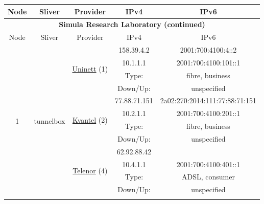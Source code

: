 \begin{small}
\begin{center}
\begin{longtable}{|c|c|c|c|c|c|c|c|}
 \multicolumn{2}{|p{8em}|}{Node} & \multicolumn{2}{|p{8em}|}{Sliver} & \multicolumn{2}{|p{8em}|}{Provider} & IPv4 & IPv6 \\ \hline
\endfirsthead
\hline
 \multicolumn{8}{|c|}{\textbf{Simula Research Laboratory (continued)}} \\ \hline
 \multicolumn{2}{|p{8em}|}{Node} & \multicolumn{2}{|p{8em}|}{Sliver} & \multicolumn{2}{|p{8em}|}{Provider} & IPv4 & IPv6 \\ \hline
\endhead
 \multirow{16}{*}{\tiny{1}} & \multicolumn{3}{|c|}{\multirow{16}{*}{\tiny{tunnelbox}}} & \multicolumn{2}{|c|}{\multirow{4}{*}{\tiny{\href{https://www.uninett.no}{Uninett} (1)}}} & \tiny{158.39.4.2} & \tiny{2001:700:4100:4::2} \\* \cline{7-7}\cline{8-8}
  & \multicolumn{3}{|c|}{} & \multicolumn{2}{|c|}{} & \tiny{10.1.1.1} & \tiny{2001:700:4100:101::1} \\* \cline{7-7}\cline{8-8}
  & \multicolumn{3}{|c|}{} & \multicolumn{2}{|c|}{} & Type: & fibre, business \\* \cline{7-7}\cline{8-8}
  & \multicolumn{3}{|c|}{} & \multicolumn{2}{|c|}{} & Down/Up:  & unspecified \\* \cline{5-5}\cline{6-6}\cline{7-7}\cline{8-8}
  & \multicolumn{3}{|c|}{} & \multicolumn{2}{|c|}{\multirow{4}{*}{\tiny{\href{http://kvantel.no}{Kvantel} (2)}}} & \tiny{77.88.71.151} & \tiny{2a02:270:2014:111:77:88:71:151} \\* \cline{7-7}\cline{8-8}
  & \multicolumn{3}{|c|}{} & \multicolumn{2}{|c|}{} & \tiny{10.2.1.1} & \tiny{2001:700:4100:201::1} \\* \cline{7-7}\cline{8-8}
  & \multicolumn{3}{|c|}{} & \multicolumn{2}{|c|}{} & Type: & fibre, business \\* \cline{7-7}\cline{8-8}
  & \multicolumn{3}{|c|}{} & \multicolumn{2}{|c|}{} & Down/Up:  & unspecified \\* \cline{5-5}\cline{6-6}\cline{7-7}\cline{8-8}
  & \multicolumn{3}{|c|}{} & \multicolumn{2}{|c|}{\multirow{4}{*}{\tiny{\href{https://www.telenor.no}{Telenor} (4)}}} & \tiny{62.92.88.42} & \frownie{} \\* \cline{7-7}\cline{8-8}
  & \multicolumn{3}{|c|}{} & \multicolumn{2}{|c|}{} & \tiny{10.4.1.1} & \tiny{2001:700:4100:401::1} \\* \cline{7-7}\cline{8-8}
  & \multicolumn{3}{|c|}{} & \multicolumn{2}{|c|}{} & Type: & ADSL, consumer \\* \cline{7-7}\cline{8-8}
  & \multicolumn{3}{|c|}{} & \multicolumn{2}{|c|}{} & Down/Up:  & unspecified \\* \cline{5-5}\cline{6-6}\cline{7-7}\cline{8-8}

\end{longtable}
\end{center}
\end{small}
